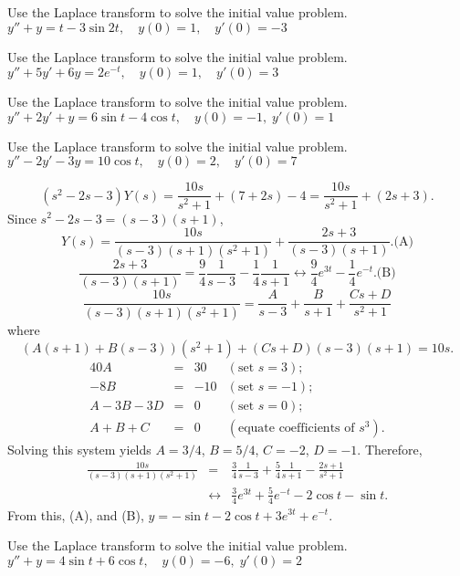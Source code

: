 \documentclass{ximera}
\begin{document}
\begin{problem}\label{exer:8.3.21} Use the Laplace transform to solve the initial value problem. $y''+y=t-3\sin2t, \quad  y(0)=1,\quad y'(0)=-3$
\end{problem}

\begin{problem}\label{exer:8.3.22} Use the Laplace transform to solve the initial value problem. $y''+5y'+6y=2e^{-t}, \quad  y(0)=1,\quad y'(0)=3$
\end{problem}

\begin{problem}\label{exer:8.3.23} Use the Laplace transform to solve the initial value problem. $y''+2y'+y=6\sin t-4\cos t, \quad  y(0)=-1,\;
y'(0)=1$
\end{problem}

\begin{problem}\label{exer:8.3.24} Use the Laplace transform to solve the initial value problem. $y''-2y'-3y=10\cos t, \quad  y(0)=2,\quad y'(0)=7$

\begin{solution}
$$
(s^2-2s-3)Y(s)=\frac{10s}{s^2+1}+(7+2s)-4=
\frac{10s}{s^2+1}+(2s+3).
$$
Since $s^2-2s-3=(s-3)(s+1)$,
$$
Y(s)=
\frac{10s}{(s-3)(s+1)(s^2+1)}+\frac{2s+3}{(s-3)(s+1)}.
\text{(A)}
$$
$$
\frac{2s+3}{(s-3)(s+1)}=\frac{9}{4}\frac{1}{s-3}-\frac{1}{4}\frac{1}{s+1}
\leftrightarrow\frac{9}{4}e^{3t}-\frac{1}{4}e^{-t}.
\text{(B)}
$$
$$
\frac{10s}{(s-3)(s+1)(s^2+1)}=\frac{A}{s-3}+\frac{B}{s+1}+\frac{Cs+D}{s^2+1}
$$
 where
$$
(A(s+1)+B(s-3))(s^2+1)+(Cs+D)(s-3)(s+1)=10s.
$$
$$
\begin{array}{rcrl}
40A&=&30&(\mbox{set }s=3);\\
-8B&=&-10& (\mbox{set }s=-1);\\
A-3B-3D&=&0& (\mbox{set }s=0);\\
A+B+C&=&0&(\mbox{equate coefficients of }s^3).
\end{array}
$$
Solving this system yields $A=3/4$, $B=5/4$,
$C=-2$, $D=-1$. Therefore,
\begin{eqnarray*}
\frac{10s}{(s-3)(s+1)(s^2+1)}
&=&\frac{3}{4}\frac{1}{s-3}+\frac{5}{4}\frac{1}{s+1}-\frac{2s+1}{s^2+1}
\\&\leftrightarrow&
\frac{3}{4}e^{3t}+\frac{5}{4}e^{-t}-2\cos t-\sin t.
\end{eqnarray*}
From this, (A), and (B),
 $y=-\sin t-2\cos t+3e^{3t}+e^{-t}$.
\end{solution}
\end{problem}

\begin{problem}\label{exer:8.3.25} Use the Laplace transform to solve the initial value problem. $y''+y=4\sin t+6\cos t, \quad  y(0)=-6,\;
y'(0)=2$
\end{problem}
\end{document}
